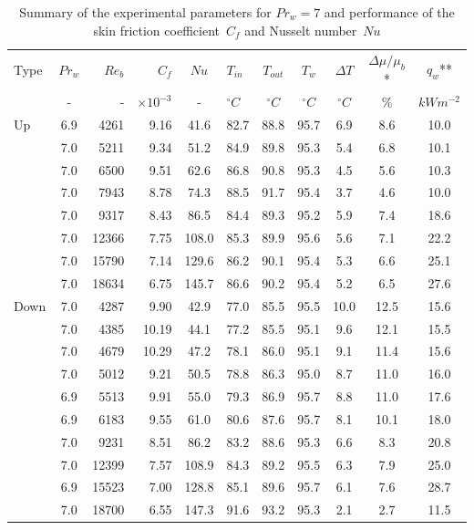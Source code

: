 \documentclass[12pt,oneside]{jbook}
\begin{document}
\clearpage
\begin{table}[h]
\centering
\caption{Summary of the experimental parameters for $Pr_{w}=7$ and performance of the skin friction coefficient\ $C_{f}$ and Nusselt number\ $Nu$}
\vspace{1zh}
\label{pr07_updown}
\begin{tabular}{lSrrSlSSSSS}
\toprule%
{Type} & {{$Pr_{w}$}} & {$Re_{b}$} & {$C_{f}$} & {$Nu$} & {$T_{in}$} & {$T_{out}$} &  {$T_{w}$} & {$\Delta T$}  & {$\Delta \mu/ \mu_{b}$*} & {$q_{w}$**} \\
{}&{-}&{-}&{$\times10^{-3}$}&{-}&{$^\circ C$}&{$^\circ C$}&{$^\circ C$}&{$^\circ C$}&{\%}&{$kWm^{-2}$}\\\midrule %
Up   & 6.9  & 4261  & 9.16  & 41.6 & 82.7 & 88.8 & 95.7 & 6.9  & 8.6  & 10.0\\
     & 7.0  & 5211  & 9.34  & 51.2 & 84.9 & 89.8 & 95.3 & 5.4  & 6.8  & 10.1\\
     & 7.0  & 6500  & 9.51  & 62.6 & 86.8 & 90.8 & 95.3 & 4.5  & 5.6  & 10.3\\
     & 7.0  & 7943  & 8.78  & 74.3 & 88.5 & 91.7 & 95.4 & 3.7  & 4.6  & 10.0\\
     & 7.0  & 9317  & 8.43  & 86.5 & 84.4 & 89.3 & 95.2 & 5.9  & 7.4  & 18.6\\
     & 7.0  & 12366 & 7.75  & 108.0& 85.3 & 89.9 & 95.6 & 5.6  & 7.1  & 22.2\\
     & 7.0  & 15790 & 7.14  & 129.6& 86.2 & 90.1 & 95.4 & 5.3  & 6.6  & 25.1\\
     & 7.0  & 18634 & 6.75  & 145.7& 86.6 & 90.2 & 95.4 & 5.2  & 6.5  & 27.6\\
\midrule
Down & 7.0  & 4287  & 9.90  & 42.9 & 77.0 & 85.5 & 95.5 & 10.0 & 12.5 & 15.6\\
     & 7.0  & 4385  & 10.19 & 44.1 & 77.2 & 85.5 & 95.1 & 9.6  & 12.1 & 15.5\\
     & 7.0  & 4679  & 10.29 & 47.2 & 78.1 & 86.0 & 95.1 & 9.1  & 11.4 & 15.6\\
     & 7.0  & 5012  & 9.21  & 50.5 & 78.8 & 86.3 & 95.0 & 8.7  & 11.0 & 16.0\\
     & 6.9  & 5513  & 9.91  & 55.0 & 79.3 & 86.9 & 95.7 & 8.8  & 11.0 & 17.6\\
     & 6.9  & 6183  & 9.55  & 61.0 & 80.6 & 87.6 & 95.7 & 8.1  & 10.1 & 18.0\\
     & 7.0  & 9231  & 8.51  & 86.2 & 83.2 & 88.6 & 95.3 & 6.6  & 8.3  & 20.8\\
     & 7.0  & 12399 & 7.57  & 108.9& 84.3 & 89.2 & 95.5 & 6.3  & 7.9  & 25.0\\
     & 6.9  & 15523 & 7.00  & 128.8& 85.1 & 89.6 & 95.7 & 6.1  & 7.6  & 28.7\\
     & 7.0  & 18700 & 6.55  & 147.3& 91.6 & 93.2 & 95.3 & 2.1  & 2.7  & 11.5\\
\bottomrule
\end{tabular}\\
\\
\end{table}
\end{document}
